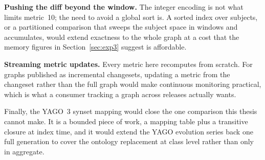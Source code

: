 \textbf{Pushing the diff beyond the window.} The integer encoding is not what
limits metric~10; the need to avoid a global sort is. A sorted index over
subjects, or a partitioned comparison that sweeps the subject space in windows
and accumulates, would extend exactness to the whole graph at a cost that the
memory figures in Section~\ref{sec:exp3} suggest is affordable.

\textbf{Streaming metric updates.} Every metric here recomputes from scratch. For
graphs published as incremental changesets, updating a metric from the changeset
rather than the full graph would make continuous monitoring practical, which is
what a consumer tracking a graph across releases actually wants.

Finally, the YAGO~3 synset mapping would close the one comparison this thesis
cannot make. It is a bounded piece of work, a mapping table plus a transitive
closure at index time, and it would extend the YAGO evolution series back one
full generation to cover the ontology replacement at class level rather than only
in aggregate.
